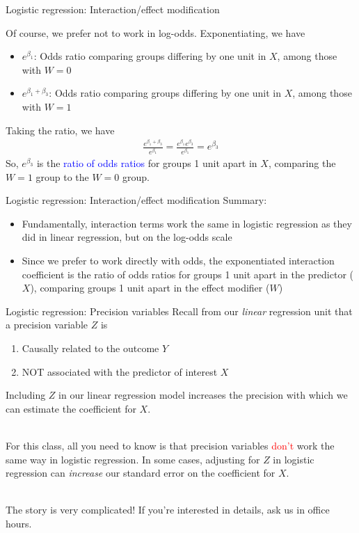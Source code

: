 \documentclass[10pt,t]{beamer}
\begin{document}
\begin{frame}{Logistic regression: Interaction/effect modification}

Of course, we prefer not to work in log-odds. Exponentiating, we have\pause
\begin{itemize}
	\item $e^{\beta_1}$: Odds ratio comparing groups differing by one unit in $X$, among those with $W = 0$\pause
	\item $e^{\beta_1 + \beta_3}$: Odds ratio comparing groups differing by one unit in $X$, among those with $W = 1$\pause
\end{itemize}
Taking the ratio, we have
\begin{align*}
	\frac{e^{\beta_1 + \beta_3}}{e^{\beta_1}} = \frac{e^{\beta_1}e^{\beta_3}}{e^{\beta_1}} = e^{\beta_3}
\end{align*}\pause
So, $e^{\beta_3}$ is the \textcolor{blue}{ratio of odds ratios} for groups 1 unit apart in $X$, comparing the $W = 1$ group to the $W = 0$ group. 
\end{frame}

\begin{frame}{Logistic regression: Interaction/effect modification}
	Summary: 
	\begin{itemize}
		\item Fundamentally, interaction terms work the same in logistic regression as they did in linear regression, but on the log-odds scale
		\item Since we prefer to work directly with odds, the exponentiated interaction coefficient is the ratio of odds ratios for groups 1 unit apart in the predictor ($X$), comparing groups 1 unit apart in the effect modifier ($W$)
	\end{itemize}
\end{frame}

\begin{frame}{Logistic regression: Precision variables}
	Recall from our \textit{linear} regression unit that a precision variable $Z$ is 
	\begin{enumerate}
		\item Causally related to the outcome $Y$
		\item NOT associated with the predictor of interest $X$ 
	\end{enumerate}
	Including $Z$ in our linear regression model increases the precision with which we can estimate the coefficient for $X$. 
	\\ ~\ 
	
	For this class, all you need to know is that precision variables \textcolor{red}{don't} work the same way in logistic regression. In some cases, adjusting for $Z$ in logistic regression can \textit{increase} our standard error on the coefficient for $X$. 
	\\ ~\ 
	
	The story is very complicated! If you're interested in details, ask us in office hours. 
\end{frame}
\end{document}
